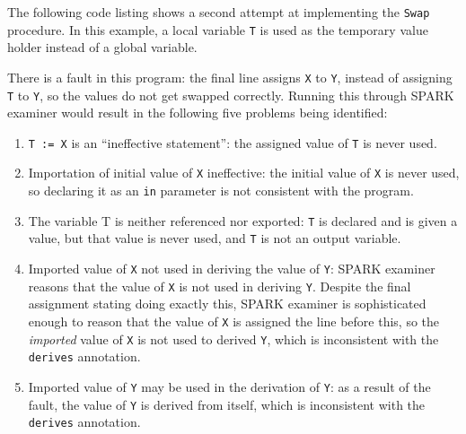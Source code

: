 \begin{example}
\label{ex:SPARK:incorrect-derives}
The following code listing shows a second attempt at implementing the \texttt{Swap} procedure. In this example, a local variable \texttt{T} is used as the temporary value holder instead of a global variable. 






There is a fault in this program: the final line assigns \texttt{X} to \texttt{Y}, instead of assigning \texttt{T} to \texttt{Y}, so the values do not get swapped correctly. Running this through SPARK examiner would result in the following five problems being identified:

\begin{enumerate}

 \item {\tt T := X} is an ``ineffective statement'': the assigned value of \texttt{T} is never used.

 \item Importation of initial value of {\tt X} ineffective: the initial value of \texttt{X} is never used, so declaring it as an \texttt{in} parameter is not consistent with the program.

 \item The variable T is neither referenced nor exported: \texttt{T} is declared and is given a value, but that value is never used, and \texttt{T} is not an output variable.

 \item Imported value of \texttt{X} not used in deriving the value of \texttt{Y}: SPARK examiner reasons that the value of \texttt{X} is not used in deriving \texttt{Y}. Despite the final assignment stating doing exactly this, SPARK examiner is sophisticated enough to reason that the value of \texttt{X} is assigned the line before this, so the \emph{imported} value of \texttt{X} is not used to derived \texttt{Y}, which is inconsistent with the \texttt{derives} annotation.

 \item Imported value of {\tt Y} may be used in the derivation of {\tt Y}: as a result of the fault, the value of \texttt{Y} is derived from itself, which is inconsistent with the \texttt{derives} annotation.

\end{enumerate}
\end{example}

